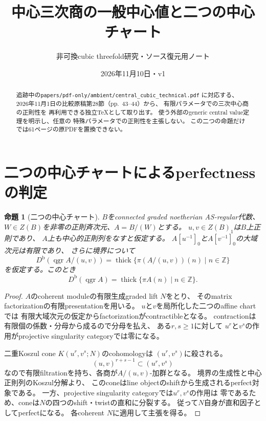 \documentclass[a4paper,11pt]{ltjsarticle}
\title{中心三次商の一般中心値と二つの中心チャート}
\author{非可換cubic threefold研究・ソース復元用ノート}
\date{2026年11月10日・v1}
\newtheorem{proposition}[theorem]{命題}
\newcommand{\qgr}{\operatorname{qgr}}
\newcommand{\thick}{\operatorname{thick}}
\newcommand{\Db}{D^{\mathrm b}}
\begin{document}
\maketitle
\begin{abstract}
追跡中の\texttt{papers/pdf-only/ambient/central\_cubic\_technical.pdf}
に対応する、2026年11月1日の比較原稿第28節（pp.~43--44）から、
有限パラメータでの三次中心商の正則性を
再利用できる独立TeXとして取り出す。
使う外部のgeneric central value定理を明示し、任意の
特殊パラメータでの正則性を主張しない。
この二つの命題だけでは61ページの原PDFを置換できない。
\end{abstract}

\section{二つの中心チャートによるperfectnessの判定}
\begin{proposition}[二つの中心チャート]\label{prop:patch}
$B$をconnected graded noetherian AS-regular代数、
$W\in Z(B)$を非零の正則斉次元、$A=B/(W)$とする。
$u,v\in Z(B)_1$は$B$上正則であり、
$A$上も中心的正則列をなすと仮定する。
$A[u^{-1}]_0$と$A[v^{-1}]_0$の大域次元は有限であり、
さらに境界について
\[
\Db(\qgr A/(u,v))
=\thick\{\pi(A/(u,v))(n)\mid n\in\mathbb Z\}
\]
を仮定する。このとき
\[
\Db(\qgr A)=\thick\{\pi A(n)\mid n\in\mathbb Z\}.
\]
\end{proposition}
\begin{proof}
$A$のcoherent moduleの有限生成graded lift $N$をとり、
そのmatrix factorizationの有限presentationを用いる。
$u$と$v$を局所化した二つのaffine chartでは
有限大域次元の仮定からfactorizationがcontractibleとなる。
contractionは有限個の係数・分母から成るので分母を払え、
ある$r,s\ge1$に対して
$u^r$と$v^s$の作用がprojective singularity categoryでは零になる。

二重Koszul cone $K(u^r,v^s;N)$のcohomologyは
$(u^r,v^s)$に殺される。
\[
(u,v)^{r+s-1}\subset (u^r,v^s)
\]
なので有限filtrationを持ち、各商が$A/(u,v)$-加群となる。
境界の生成性と中心正則列のKoszul分解より、
このconeはline objectのshiftから生成されるperfect対象である。
一方、projective singularity categoryでは$u^r,v^s$の作用は
零であるため、coneは$N$の四つのshift・twistの直和に分裂する。
従って$N$自身が直和因子としてperfectになる。
各coherent $N$に適用して主張を得る。
\end{proof}
\end{document}
